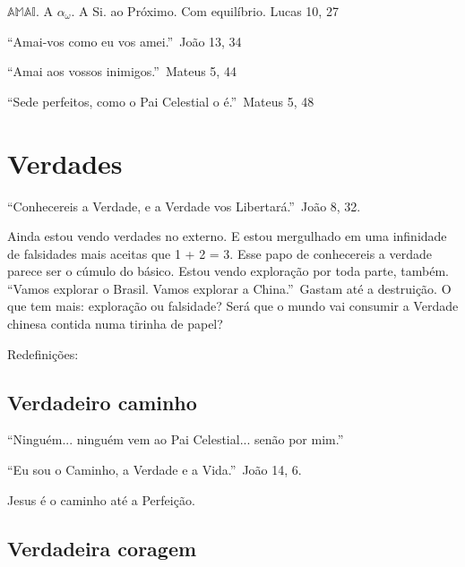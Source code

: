 \documentclass[12pt,a4paper]{article}
\begin{document}
		$\mathbb{AMAI}$. A $ \alpha_\omega $. A Si. ao Pr\'oximo. Com equil\'ibrio. Lucas 10, 27 \cite{x}

		\textquotedblleft Amai-vos como eu vos amei.\textquotedblright\, Jo\~ao 13, 34

		\textquotedblleft Amai aos vossos inimigos.\textquotedblright\, Mateus 5, 44

		\textquotedblleft Sede perfeitos, como o Pai Celestial o \'e.\textquotedblright\, Mateus 5, 48


	\section{Verdades}
		\begin{flushright}
		\end{flushright}

		\textquotedblleft Conhecereis a Verdade, e a Verdade vos Libertar\'a.\textquotedblright\, Jo\~ao 8, 32.

		Ainda estou vendo verdades no externo. E estou mergulhado em uma infinidade de falsidades mais aceitas que 1 + 2 = 3. Esse papo de conhecereis a verdade parece ser o c\'umulo do b\'asico. Estou vendo explora\c{c}\~ao por toda parte, tamb\'em. \textquotedblleft Vamos explorar o Brasil. Vamos explorar a China.\textquotedblright\, Gastam at\'e a destrui\c{c}\~ao. O que tem mais: explora\c{c}\~ao ou falsidade? Ser\'a que o mundo vai consumir a Verdade chinesa contida numa tirinha de papel?

		Redefini\c{c}\~oes:

		\subsection{Verdadeiro caminho}
			\begin{flushright}
			\end{flushright}

			\textquotedblleft Ningu\'em... ningu\'em vem ao Pai Celestial... sen\~ao por mim.\textquotedblright

			\textquotedblleft Eu sou o Caminho, a Verdade e a Vida.\textquotedblright\, Jo\~ao 14, 6.

			Jesus \'e o caminho\cite{x} at\'e a Perfei\c{c}\~ao\cite{x}.

		\subsection{Verdadeira coragem}
			\begin{flushright}
			\end{flushright}
\end{document}
